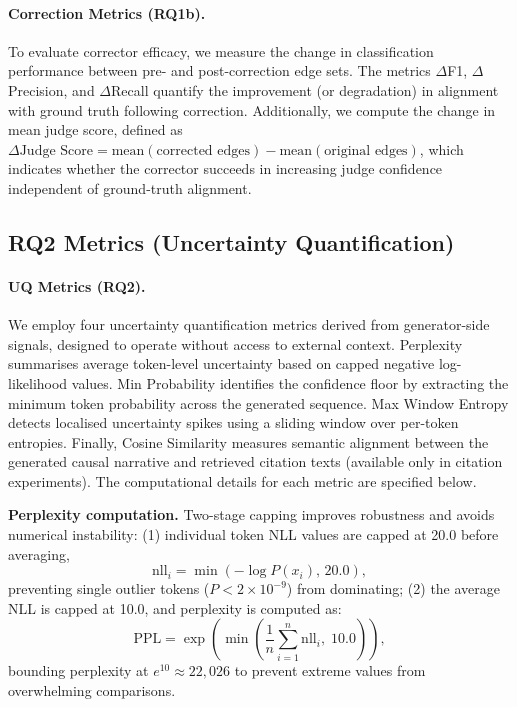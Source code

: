 \paragraph{Correction Metrics (RQ1b).}
To evaluate corrector efficacy, we measure the change in classification performance between pre- and post-correction edge sets. The metrics $\Delta$F1, $\Delta$Precision, and $\Delta$Recall quantify the improvement (or degradation) in alignment with ground truth following correction. Additionally, we compute the change in mean judge score, defined as $\Delta\text{Judge Score} = \text{mean}(\text{corrected edges}) - \text{mean}(\text{original edges})$, which indicates whether the corrector succeeds in increasing judge confidence independent of ground-truth alignment.

\subsection{RQ2 Metrics (Uncertainty Quantification)}

\paragraph{UQ Metrics (RQ2).}\label{sec:uq_metrics_capping}
We employ four uncertainty quantification metrics derived from generator-side signals, designed to operate without access to external context. Perplexity summarises average token-level uncertainty based on capped negative log-likelihood values. Min Probability identifies the confidence floor by extracting the minimum token probability across the generated sequence. Max Window Entropy detects localised uncertainty spikes using a sliding window over per-token entropies. Finally, Cosine Similarity measures semantic alignment between the generated causal narrative and retrieved citation texts (available only in citation experiments). The computational details for each metric are specified below.

\noindent\textbf{Perplexity computation.} Two-stage capping improves robustness and avoids numerical instability: (1) individual token NLL values are capped at 20.0 before averaging,
\[
\mathrm{nll}_i=\min\!\left(-\log P(x_i),\,20.0\right),
\]
preventing single outlier tokens (\(P<2\times 10^{-9}\)) from dominating; (2) the average NLL is capped at 10.0, and perplexity is computed as:
\[
\mathrm{PPL} = \exp\!\left(\min\!\left(\frac{1}{n}\sum_{i=1}^{n}\mathrm{nll}_i,\;10.0\right)\right),
\]
bounding perplexity at \(e^{10}\approx 22{,}026\) to prevent extreme values from overwhelming comparisons.

